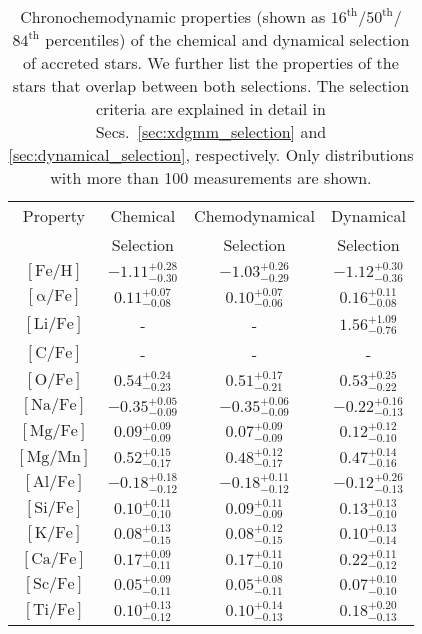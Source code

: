 \begingroup
\renewcommand{\arraystretch}{1.19}
\begin{table}
\centering
\caption{Chronochemodynamic properties (shown as $16^\text{th}$/$50^\text{th}$/$84^\text{th}$ percentiles) of the chemical and dynamical selection of accreted stars. We further list the properties of the stars that overlap between both selections. The selection criteria are explained in detail in Secs.~\ref{sec:xdgmm_selection} and \ref{sec:dynamical_selection}, respectively. Only distributions with more than 100 measurements are shown.}
\label{tab:chronochemodynamic_properties}
\begin{tabular}{cccc}
\hline
Property & Chemical & Chemodynamical & Dynamical \\
& Selection & Selection & Selection \\
\hline \hline
$\mathrm{[Fe/H]}$ & $-1.11_{-0.30}^{+0.28}$ & $-1.03_{-0.29}^{+0.26}$ & $-1.12_{-0.36}^{+0.30}$ \\
$\mathrm{[\alpha/Fe]}$ & $0.11_{-0.08}^{+0.07}$ & $0.10_{-0.06}^{+0.07}$ & $0.16_{-0.08}^{+0.11}$ \\
$\mathrm{[Li/Fe]}$ & - & - & $1.56_{-0.76}^{+1.09}$ \\
$\mathrm{[C/Fe]}$ & - & - & - \\
$\mathrm{[O/Fe]}$ & $0.54_{-0.23}^{+0.24}$ & $0.51_{-0.21}^{+0.17}$ & $0.53_{-0.22}^{+0.25}$ \\
$\mathrm{[Na/Fe]}$ & $-0.35_{-0.09}^{+0.05}$ & $-0.35_{-0.09}^{+0.06}$ & $-0.22_{-0.13}^{+0.16}$ \\
$\mathrm{[Mg/Fe]}$ & $0.09_{-0.09}^{+0.09}$ & $0.07_{-0.09}^{+0.09}$ & $0.12_{-0.10}^{+0.12}$ \\
$\mathrm{[Mg/Mn]}$ & $0.52_{-0.17}^{+0.15}$ & $0.48_{-0.17}^{+0.12}$ & $0.47_{-0.16}^{+0.14}$ \\
$\mathrm{[Al/Fe]}$ & $-0.18_{-0.12}^{+0.18}$ & $-0.18_{-0.12}^{+0.11}$ & $-0.12_{-0.13}^{+0.26}$ \\
$\mathrm{[Si/Fe]}$ & $0.10_{-0.10}^{+0.11}$ & $0.09_{-0.09}^{+0.11}$ & $0.13_{-0.10}^{+0.13}$ \\
$\mathrm{[K/Fe]}$ & $0.08_{-0.15}^{+0.13}$ & $0.08_{-0.15}^{+0.12}$ & $0.10_{-0.14}^{+0.13}$ \\
$\mathrm{[Ca/Fe]}$ & $0.17_{-0.11}^{+0.09}$ & $0.17_{-0.10}^{+0.11}$ & $0.22_{-0.12}^{+0.11}$ \\
$\mathrm{[Sc/Fe]}$ & $0.05_{-0.11}^{+0.09}$ & $0.05_{-0.11}^{+0.08}$ & $0.07_{-0.10}^{+0.10}$ \\
$\mathrm{[Ti/Fe]}$ & $0.10_{-0.12}^{+0.13}$ & $0.10_{-0.13}^{+0.14}$ & $0.18_{-0.13}^{+0.20}$ \\

\end{tabular}
\end{table}
